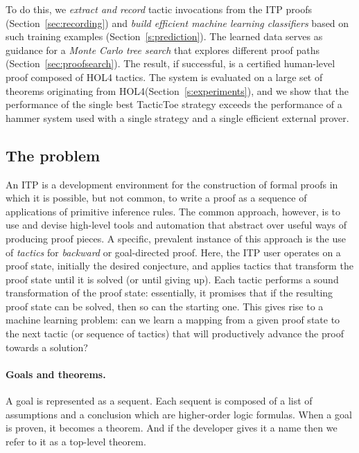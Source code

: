 \documentclass[runningheads,a4paper,draft]{svjour3}
\newcommand{\todoi}[1]{\todo[inline]{#1}}
\def\holfour{\textsf{HOL4}\xspace}
\def\tactictoe{\textsf{TacticToe}\xspace}
\begin{document}
\todoi{Rewrite the plan}
  To do this, we \emph{extract and record} tactic invocations from the ITP
  proofs (Section~\ref{sec:recording}) and
  \emph{build efficient machine learning classifiers} based on such training
  examples (Section~\ref{s:prediction}).  The learned data serves as
  guidance for a \emph{Monte Carlo tree search} that explores different
  proof paths (Section~\ref{sec:proofsearch}). The result, if
  successful, is a certified human-level proof composed of \holfour
  tactics.  The system is evaluated on a large set of theorems originating
  from \holfour (Section~\ref{s:experiments}), and we show that the performance
  of the single best \tactictoe strategy exceeds the performance of a hammer
  system used with a single strategy and a single efficient external prover.


\subsection{The problem}
An ITP is a development environment for the construction of formal proofs in which it is possible, but not common, to write a proof as a sequence of applications of primitive inference rules.
The common approach, however, is to use and devise high-level tools and automation that abstract over useful ways of producing proof pieces.
A specific, prevalent instance of this approach is the use of \emph{tactics} for \emph{backward} or goal-directed proof.
Here, the ITP user operates on a proof state, initially the desired conjecture, and applies tactics that transform the proof state until it is solved (or until giving up).
Each tactic performs a sound transformation of the proof state: essentially, it promises that if the resulting proof state can be solved, then so can the starting one.
This gives rise to a machine learning problem: can we learn a mapping from a given proof state to the next tactic (or sequence of tactics) that will productively advance the proof towards a solution?

\paragraph{Goals and theorems.} 
A goal is represented as a sequent. Each sequent is composed of 
a list of assumptions and a conclusion which are higher-order logic formulas. 
When a goal is proven, it becomes a theorem. And if the developer gives it a 
name then we refer to it as a top-level theorem.
\end{document}
